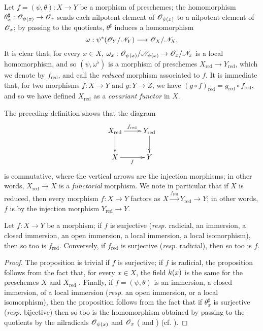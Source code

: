 \begin{env}[5.1.5]
\label{1.5.1.5}
Let $f=(\psi,\theta):X\to Y$ be a morphism of preschemes;
the homomorphism $\theta_x^\sharp:\OO_{\psi(x)}\to\OO_x$ sends each nilpotent element of $\mathscr{O}_{\psi(x)}$ to a nilpotent element of $\mathscr{O}_x$;
by passing to the quotients, $\theta^\sharp$ induces a homomorphism
\[
  \omega:\psi^*(\OO_Y/\sh{N}_Y)\to\OO_X/\sh{N}_X.
\]
It is clear that, for every $x\in X$, $\omega_x:\OO_{\psi(x)}/\sh{N}_{\psi(x)}\to\OO_x/\sh{N}_x$ is a local homomorphism, and so $(\psi,\omega^\flat)$ is a morphism of preschemes $X_\mathrm{red}\to Y_\mathrm{red}$, which we denote by $f_\mathrm{red}$, and call the \emph{reduced} morphism associated to $f$.
It is immediate that, for two morphisms $f:X\to Y$ and $g:Y\to Z$, we have $(g\circ f)_\mathrm{red}=g_\mathrm{red}\circ f_\mathrm{red}$, and so we have defined $X_\mathrm{red}$ as a \emph{covariant functor} in $X$.

The preceding definition shows that the diagram
\[
  \xymatrix{
    X_\mathrm{red}\ar[r]^{f_\mathrm{red}}\ar[d] &
    Y_\mathrm{red}\ar[d]\\
    X\ar[r]_f &
    Y
  }
\]
is commutative, where the vertical arrows are the injection morphisms;
in other words, $X_\mathrm{red}\to X$ is a \emph{functorial} morphism.
We note in particular that if $X$ is reduced, then every morphism $f:X\to Y$ factors as $X\xrightarrow{f_\mathrm{red}}Y_\mathrm{red}\to Y$;
in other words, $f$ is  by the injection morphism $Y_\mathrm{red}\to Y$.
\end{env}

\begin{prop}[5.1.6]
\label{1.5.1.6}
Let $f:X\to Y$ be a morphism;
if $f$ is surjective (\emph{resp.} radicial, an immersion, a closed immersion, an open immersion, a local immersion, a local isomorphism), then so too is $f_\mathrm{red}$.
Conversely, if $f_\mathrm{red}$ is surjective (\emph{resp.} radicial), then so too is $f$.
\end{prop}

\begin{proof}
\label{proof-1.5.1.6}
The proposition is trivial if $f$ is surjective;
if $f$ is radicial, the proposition follows from the fact that, for every $x\in X$, the field $k(x)$ is the same for the preschemes $X$ and $X_\mathrm{red}$ .
Finally, if $f=(\psi,\theta)$ is an immersion, a closed immersion, of a local immersion (\emph{resp.} an open immersion, or a local isomorphism), then the proposition follows from the fact that if $\theta_x^\sharp$ is surjective (\emph{resp.} bijective) then so too is the homomorphism obtained by passing to the quotients by the nilradicals $\mathscr{O}_{\psi(x)}$ and $\mathscr{O}_x$ ( and ) (cf. ).
\end{proof}

